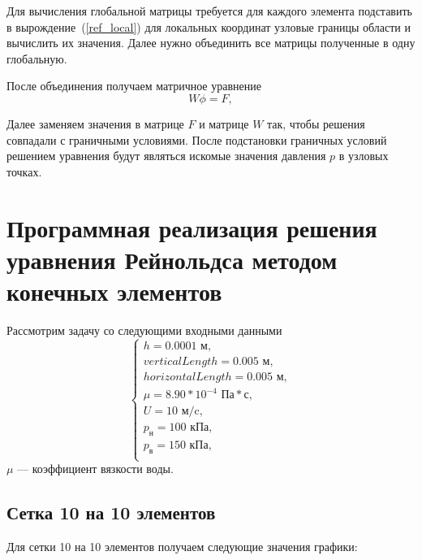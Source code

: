 \documentclass[12pt, a4paper]{article}
\begin{document}
Для вычисления глобальной матрицы требуется для каждого элемента подставить в вырождение~(\ref{ref_local}) для локальных координат узловые границы области и вычислить их значения. 
Далее нужно объединить все матрицы полученные в одну глобальную.

После объединения получаем матричное уравнение 
\begin{equation*}
	W \phi = F,
\end{equation*}

Далее заменяем значения в матрице $F$ и матрице $W$ так, чтобы решения совпадали с граничными условиями.
После подстановки граничных условий решением уравнения будут являться искомые значения давления $p$ в узловых точках.

\section{Программная реализация решения уравнения Рейнольдса методом конечных элементов}

Рассмотрим задачу со следующими входными данными 
\begin{equation*}
	\begin{cases}
		h = 0.0001 \text{ м}, \\
		verticalLength = 0.005 \text{ м}, \\
		horizontalLength = 0.005 \text{ м}, \\
		\mu = 8.90 * 10^{-4} \text{ Па}*\text{с}, \\
		U = 10 \text{ м/c}, \\
		p_{\text{н}} = 100 \text{ кПа}, \\
		p_{\text{в}} = 150 \text{ кПа}, \\
	\end{cases}	
\end{equation*}
$\mu$ --- коэффициент вязкости воды.

\subsection{Сетка 10 на 10 элементов}

Для сетки 10 на 10 элементов получаем следующие значения графики:
\end{document}
